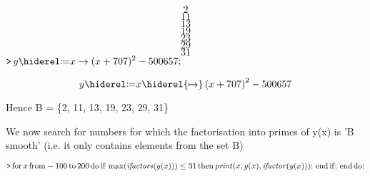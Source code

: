 \documentclass{article}
\begin{document}
\begin{dmath*}
2
\end{dmath*}
\vspace{-\bigskipamount}
\begin{dmath*}
11
\end{dmath*}
\vspace{-\bigskipamount}
\begin{dmath*}
13
\end{dmath*}
\vspace{-\bigskipamount}
\begin{dmath*}
19
\end{dmath*}
\vspace{-\bigskipamount}
\begin{dmath*}
23
\end{dmath*}
\vspace{-\bigskipamount}
\begin{dmath*}
29
\end{dmath*}
\vspace{-\bigskipamount}
\begin{dmath}\label{(3)}
31
\end{dmath}
\mapleinput
{$ \displaystyle \texttt{>\,} y \coloneqq x \rightarrow (x +707)^{2}-500657; $}

\begin{dmath}\label{(4)}
y \coloneqq x \hiderel{\mapsto }\left(x +707\right)^{2}-500657
\end{dmath}
\begin{Maple Normal}
Hence B = \{2, 11, 13, 19, 23, 29, 31\}
\end{Maple Normal}
\begin{Maple Normal}
We now search for numbers for which the factorisation into primes of y(x) is 'B smooth' (i.e. it only contains elements from the set B)
\end{Maple Normal}
\mapleinput
{$ \displaystyle \texttt{>\,} \mathrm{for}\,x \,\mathrm{from}-100\,\mathrm{to}\,200\,\mathrm{do}\,\mathrm{if}\,\max (\mathit{ifactors} (y (x)))\le 31\,\mathrm{then}\,\mathit{print} (x ,y (x),\mathit{ifactor} (y (x)));\,\mathrm{end}\,\mathrm{if};\,\mathrm{end}\,\mathrm{do}; $}
\end{document}
